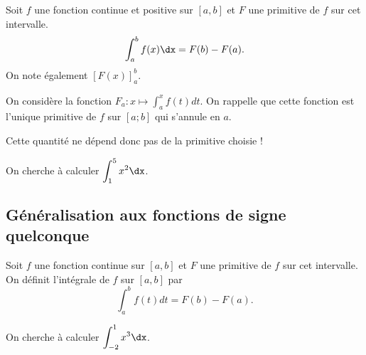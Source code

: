 \documentclass[11pt,fleqn, openany]{book} %
\begin{document}
\begin{definition}Soit $f$ une fonction continue et positive sur $[a,b]$ et $F$ une primitive de $f$ sur cet intervalle.
 \[\displaystyle\int_{a}^b f(x)\dx=F(b)-F(a).\]
 On note également $[F(x)]_a^b$.\end{definition}
 
\begin{demonstration} On considère la fonction $F_a:x\mapsto \displaystyle\int_{a}^x f(t)dt$. On rappelle que cette fonction est l'unique primitive de $f$ sur $[a;b]$ qui s'annule en $a$. 

\vskip150pt

\end{demonstration}
 
Cette quantité ne dépend donc pas de la primitive choisie !
 
\begin{example}On cherche à calculer  $\displaystyle\int_{1}^5 x^2 \dx $.

\vskip40pt
\end{example}
 

\subsection{Généralisation aux fonctions de signe quelconque}

\begin{definition}Soit $f$ une fonction continue sur $[a,b]$ et $F$ une primitive de $f$ sur cet intervalle. On définit l'intégrale de $f$ sur $[a,b]$ par \[\displaystyle\int_{a}^b f(t)dt = F(b)-F(a).\]\end{definition}

\begin{example} On cherche à calculer $\displaystyle\int_{-2}^1 x^3 \dx$.
\vskip40pt
\end{example}

 \newpage
\end{document}
